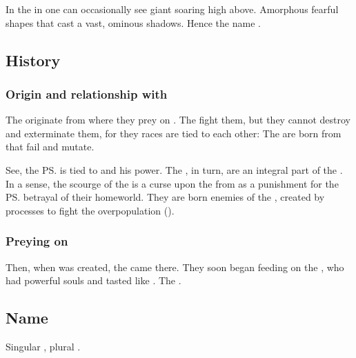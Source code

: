 In the \wylde in \Azmith one can occasionally see giant \umbrae soaring high above. 
Amorphous fearful shapes that cast a vast, ominous shadows.
Hence the name \quo{\umbra}. 









\subsection{History}





\subsubsection{Origin and relationship with \banes}
The \umbrae{} originate from \Erebos{} where they prey on \banes. 
The \banes{} fight them, but they cannot destroy and exterminate them, for they races are tied to each other: 
The \umbrae{} are born from \banes{} that fail and mutate.

See, the \ps{\banes}{} \matrixx{} is tied to \FatherErebos{} and his power. 
The \umbrae, in turn, are an integral part of the \bane{} \matrixx. 
In a sense, the scourge of the \umbrae{} is a curse upon the \banes{} from \FatherErebos{} as a punishment for the \ps{\banes}{} betrayal of their homeworld. 
They are born enemies of the \banes{}, created by  processes to fight the \bane{} overpopulation (). 





\subsubsection{Preying on \resphain}
Then, when \Nyx{} was created, the \umbrae{} came there. 
They soon began feeding on the \resphain, who had powerful souls and tasted like \banes. 
The . 









\subsection{Name}
Singular \emph{\umbra{}}, plural \emph{\umbrae{}}. 









